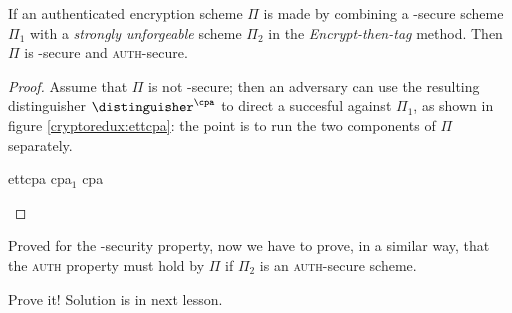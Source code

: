 \begin{theorem}
    If an authenticated encryption scheme $\Pi$ is made by combining a \cpa-secure \ske{} scheme $\Pi_1$ with a \emph{strongly unforgeable} \mac{} scheme $\Pi_2$ in the \emph{Encrypt-then-tag} method. Then $\Pi$ is \cpa-secure and \textsc{auth}-secure. 
\end{theorem}

\begin{proof}

    Assume that $\Pi$ is not \cpa-secure; then an adversary can use the resulting distinguisher $\distinguisher^{\cpa}$ to direct a succesful \cpa{} against $\Pi_1$, as shown in figure \ref{cryptoredux:ettcpa}: the point is to run the two components of $\Pi$ separately.

    \begin{cryptoredux}
        {ettcpa}
        {}
        {cpa$_1$}
        {cpa}


        \cseqbeginloop
        \cseqendloop

        \cseqdelay
        

        \cseqdelay

        \cseqbeginloop
        \cseqendloop

        \cseqdelay


    \end{cryptoredux}


\end{proof}

Proved for the \cpa-security property, now we have to prove, in a similar way, that the \textsc{auth} property must hold by $\Pi$ if $\Pi_2$ is an \textsc{auth}-secure scheme.
\begin{exercise}
    Prove it! Solution is in next lesson.
\end{exercise}
